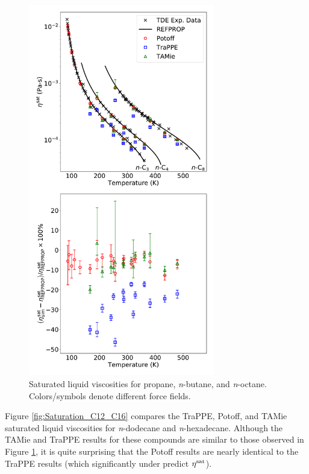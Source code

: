 \documentclass[preprint,review,12pt]{elsarticle}
\begin{document}
\begin{figure}[p!]
	\centering
	\includegraphics[width=3.2in]{compare_force_fields_alkanes.pdf}
	\caption{Saturated liquid viscosities for propane, \textit{n}-butane, and \textit{n}-octane. Colors/symbols denote different force fields.}
	\label{fig:Saturation_C3_C4_C8}
\end{figure} 

Figure \ref{fig:Saturation_C12_C16} compares the TraPPE, Potoff, and TAMie saturated liquid viscosities for \textit{n}-dodecane and \textit{n}-hexadecane. Although the TAMie and TraPPE results for these compounds are similar to those observed in Figure \ref{fig:Saturation_C3_C4_C8}, it is quite surprising that the Potoff results are nearly identical to the TraPPE results (which significantly under predict $\eta^{\rm sat}$). 
\end{document}
